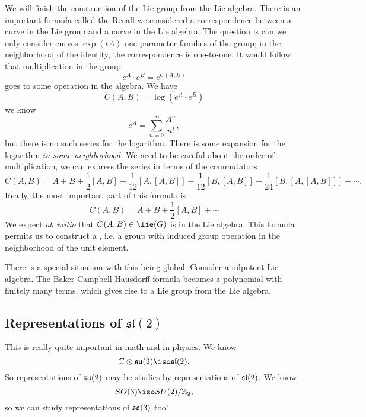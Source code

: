 We will finish the construction of the Lie group from the Lie
algebra. There is an important formula called the
 Recall we considered a
correspondence between a curve in the Lie group and a curve in
the Lie algebra. The question is can we only consider curves
$\exp(tA)$ one-parameter families of the group; in the
neighborhood of the identity, the correspondence is
one-to-one. It would follow that multiplication in the group
\begin{equation}
e^{A}\cdot e^{B}=e^{C(A,B)}
\end{equation}
goes to some operation in the algebra. We have
\begin{equation}
C(A,B) = \log(e^{A}\cdot e^{B})
\end{equation}
we know
\begin{equation}
e^{A}=\sum^{\infty}_{n=0}\frac{A^{n}}{n!},
\end{equation}
but there is no such series for the logarithm. There is some
expansion for the logarithm \emph{in some neighborhood.} We need
to be careful about the order of multiplication, we can express
the series in terms of the commutators
\begin{equation}
C(A,B)=A+B+\frac{1}{2}[A,B]+\frac{1}{12}[A,[A,B]]-\frac{1}{12}[B,[A,B]]-\frac{1}{24}[B,[A,[A,B]]]+\cdots.
\end{equation}
Really, the most important part of this formula is
\begin{equation}
C(A,B)=A+B+\frac{1}{2}[A,B]+\cdots
\end{equation}
We expect \emph{ab initio} that $C(A,B)\in\lie(G)$ is in the Lie
algebra. This formula permits us to construct a ,
i.e. a group with induced group operation in the neighborhood of
the unit element.

There is a special situation with this being global. Consider a
nilpotent Lie algebra. The Baker-Campbell-Hausdorff formula
becomes a polynomial with finitely many terms, which gives rise
to a Lie group from the Lie algebra.

\subsection{Representations of \texorpdfstring{$\mathfrak{sl}(2)$}{sl2}}

This is really quite important in math and in physics. We know
\begin{equation}
\Bbb{C}\otimes\frak{su}(2)\iso\frak{sl}(2).
\end{equation}
So representations of $\frak{su}(2)$ may be studies by
representations of $\frak{sl}(2)$. We know
\begin{equation}
SO(3)\iso SU(2)/\Bbb{Z}_{2},
\end{equation}
so we can study representations of $\frak{so}(3)$ too!

